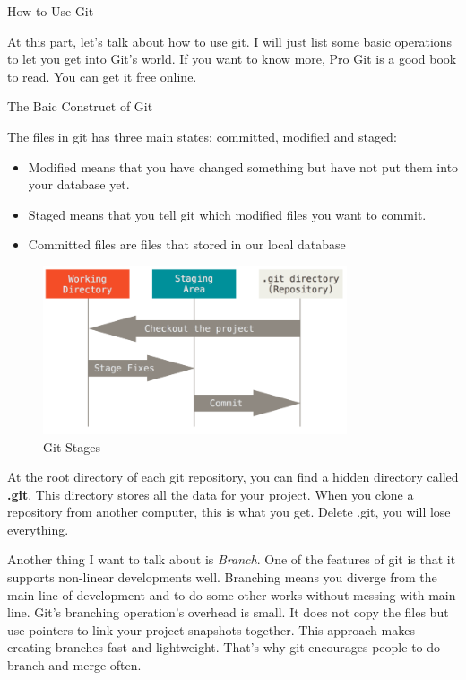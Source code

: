 \documentclass[10pt, a4papaer]{article}
\begin{document}
\begin{section}{How to Use Git}

At this part, let's talk about how to use git. I will just list some basic
operations to let you get into Git's world. If you want to know more,
\href{https://git-scm.com/book/en/v2}{\underline{Pro Git}} is a good book to read.
You can get it free online.

\begin{subsection}{The Baic Construct of Git}

The files in git has three main states: committed, modified and staged:
\begin{itemize}
\item Modified means that you have changed something but have not put them into your database yet.
\item Staged means that you tell git which modified files you want to commit.
\item Committed files are files that stored in our local database
\end{itemize}

\begin{figure}[h]
    \centering
    \includegraphics[width=0.8\textwidth]{images/git-stages}
    \caption{Git Stages}
\end{figure}

At the root directory of each git repository, you can find a hidden directory
called \textbf{.git}. This directory stores all the data for your project. When
you clone a repository from another computer, this is what you get. Delete .git,
you will lose everything.

Another thing I want to talk about is \textit{Branch}. One of the features of
git is that it supports non-linear developments well. Branching means you
diverge from the main line of development and to do some other works without
messing with main line. Git's branching operation's overhead is small. It does
not copy the files but use pointers to link your project snapshots together.
This approach makes creating branches fast and lightweight. That's why git
encourages people to do branch and merge often.


\end{subsection}
\end{section}
\end{document}
